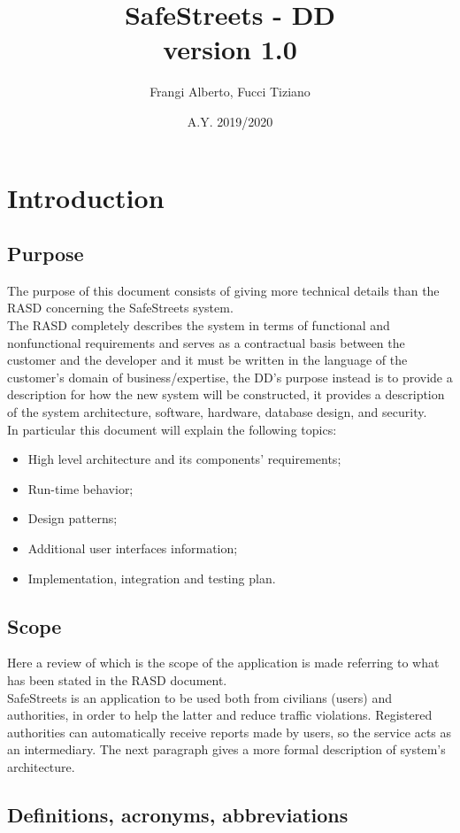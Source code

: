 \documentclass[12pt,a4paper]{report}
\title{SafeStreets - DD \\ \large version 1.0}
\author{Frangi Alberto, Fucci Tiziano}
\date{A.Y. 2019/2020}
\begin{document}
	\maketitle
	\tableofcontents
	\chapter{Introduction}
		\section{Purpose}
			The purpose of this document consists of giving more technical details than the RASD concerning the SafeStreets
			system.\\
			The RASD completely describes the system in terms of functional and nonfunctional requirements and
			serves as a contractual basis between the customer and the developer and it must be written in the language of
			the customer's domain of business/expertise, the DD's purpose instead is to provide a description for how the new
			system will be constructed, it provides a description of the system architecture, software, hardware, database
			design, and security.\\
			In particular this document will explain the following topics:
			\begin{itemize}
				\item High level architecture and its components' requirements;
				\item Run-time behavior;
				\item Design patterns;
				\item Additional user interfaces information;
				\item Implementation, integration and testing plan.
			\end{itemize}
		\section{Scope}
			Here a review of which is the scope of the application is made referring to what	has been stated in the RASD
			document.\\
			SafeStreets is an application to be used both from civilians (users) and authorities, in order to help the latter and
			reduce traffic violations. Registered authorities can automatically receive reports made by users, so the service acts
			as an intermediary. The next paragraph gives a more formal description of system's architecture.

		\section{Definitions, acronyms, abbreviations}
\end{document}

